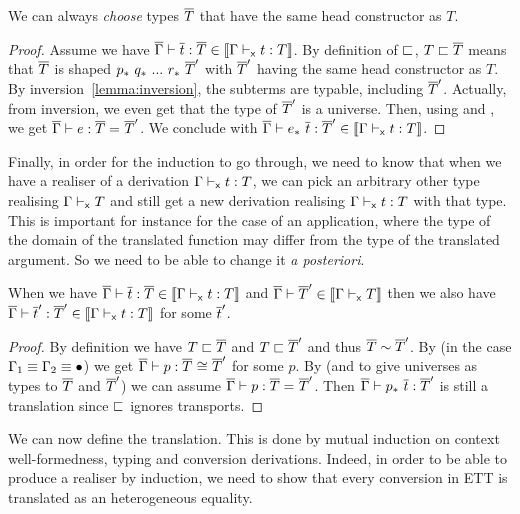 \begin{lemma}
  We can always \emph{choose} types $\overline{T}$ that have the same head constructor
  as $T$.
\end{lemma}

\begin{proof}
  Assume we have $\overline{\Gamma} \vdash \overline{t} : \overline{T} \in \llbracket \Gamma \vdash_{\mathsf{x}} t : T \rrbracket$.
  By definition of $\sqsubset$,
  $T \sqsubset \overline{T}$ means that $\overline{T}$ is shaped
  $\transpo{p}\ \transpo{q}\ ...\ \transpo{r}\ \Tb'$ with $\overline{T}'$ having
  the same head constructor as $T$. By inversion~\eqref{lemma:inversion}, the
  subterms are typable, including $\overline{T}'$. Actually, from inversion, we
  even get that the type of $\overline{T}'$ is a universe. Then,
  using  and , we get
  $\overline{\Gamma} \vdash e : \overline{T} =_{} \overline{T}'$.
  We conclude with
  $\isterm{\Gb}{\transpo{e}\ \tb}{\Tb'} \in \transl{\xisterm{\Ga}{t}{T}}$.
\end{proof}

Finally, in order for the induction to go through, we need to know
that when we have a realiser of a derivation $\Gamma \vdash_{\mathsf{x}} t : T$, we can
pick an arbitrary other type realising $\Gamma \vdash_{\mathsf{x}} T$ and still
get a new derivation realising $\Gamma \vdash_{\mathsf{x}} t : T$ with that type.
%
This is important for instance for the case of an application, where
the type of the domain of the translated function may differ from the
type of the translated argument. So we need to be able to change it \textit{a
posteriori}.


\begin{lemma}
  When we have $\overline{\Gamma} \vdash \overline{t} : \overline{T} \in \llbracket \Gamma \vdash_{\mathsf{x}} t : T \rrbracket$
  and $\overline{\Gamma} \vdash \overline{T}' \in \llbracket \Gamma \vdash_{\mathsf{x}} T \rrbracket$ then we also have
  $\overline{\Gamma} \vdash \overline{t}' : \overline{T}' \in \llbracket \Gamma \vdash_{\mathsf{x}} t : T \rrbracket$ for some $\overline{t}'$.
\end{lemma}

\begin{proof}
  By definition we have $T \sqsubset \overline{T}$ and $T \sqsubset \overline{T}'$ and thus $\overline{T} \sim \overline{T}'$.
  By 
  (in the case $\Gamma_1 \equiv \Gamma_2 \equiv \bullet$) we get
  $\overline{\Gamma} \vdash p : \overline{T} \mathrel{{}_{}{\cong}_{}} \overline{T}'$ for some $p$.
  By  (and  to give
  universes as types to $\overline{T}$ and $\overline{T}'$) we can assume
  $\overline{\Gamma} \vdash p : \overline{T} =_{} \overline{T}'$. Then
  $\overline{\Gamma} \vdash p_*\ \overline{t} : \overline{T}'$ is still a translation since $\sqsubset$
  ignores transports.
\end{proof}

We can now define the translation. This is done by mutual induction on
context well-formedness, typing and conversion derivations. Indeed,
in order to be able to produce a realiser by induction, we need to show
that every conversion in \acrshort{ETT} is translated as an heterogeneous
equality.

